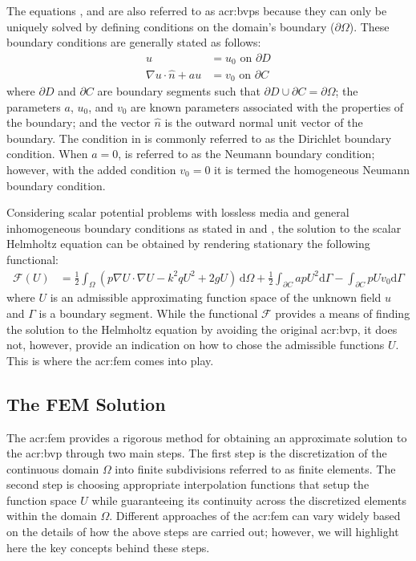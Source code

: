 The equations ,  and  are also referred to as \glspl{acr:bvp} because they can only be uniquely solved by defining conditions on the domain's boundary ($\partial \Omega$).
These boundary conditions are generally stated as follows:
\begin{align}
	u & =u_{0}\mbox{ on }\partial D \label{eqn:dbc}\\
	\nabla u\cdot\hat{n}+au & =v_{0}\mbox{ on }\partial C \label{eqn:cbc}
\end{align}
where $\partial D$ and $\partial C$ are boundary segments such that $\partial D \cup \partial C = \partial \Omega$; the parameters $a$, $u_0$, and $v_0$ are known parameters associated with the properties of the boundary; and the vector $\hat{n}$ is the outward normal unit vector of the boundary.
The condition in  is commonly referred to as the Dirichlet boundary condition.
When $a=0$,  is referred to as the Neumann boundary condition; however, with the added condition $v_0=0$ it is termed the homogeneous Neumann boundary condition.


Considering scalar potential problems with lossless media and general inhomogeneous boundary conditions as stated in  and , the solution to the scalar Helmholtz equation can be obtained by rendering stationary the following functional:
\begin{align}
	\mathcal{F}(U) & =\frac{1}{2}\int_{\Omega}\left(p\nabla U\cdot\nabla U-k^2 qU^{2}+2gU\right)\,\mathrm{d}\Omega + \frac{1}{2}\int_{\partial C} a p U^2 \mathrm{d}\Gamma - \int_{\partial C}pUv_0 \mathrm{d}\Gamma \label{eqn:globalFunc}
\end{align}
where $U$ is an admissible approximating function space of the unknown field $u$ and $\Gamma$ is a boundary segment.
While the functional $\mathcal{F}$ provides a means of finding the solution to the Helmholtz equation by avoiding the original \gls{acr:bvp}, it does not, however, provide an indication on how to chose the admissible functions $U$.
This is where the \gls{acr:fem} comes into play.



\subsection{The FEM Solution}
\label{sec:FEMSol}

The \gls{acr:fem} provides a rigorous method for obtaining an approximate solution to the \gls{acr:bvp} through two main steps.
The first step is the discretization of the continuous domain $\Omega$ into finite subdivisions referred to as finite elements.
The second step is choosing appropriate interpolation functions that setup the function space $U$ while guaranteeing its continuity across the discretized elements within the domain $\Omega$.
Different approaches of the \gls{acr:fem} can vary widely based on the details of how the above steps are carried out; however, we will highlight here the key concepts behind these steps.


